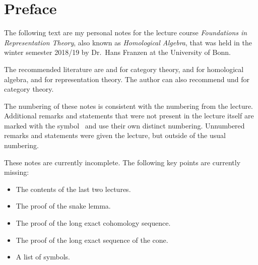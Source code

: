 \chapter{Preface}

The following text are my personal notes for the lecture course \emph{Foundations in Representation Theory}, also known as \emph{Homological Algebra}, that was held in the winter semester 2018/19 by Dr.\ Hans Franzen  at the University of Bonn.

The recommended literature are \cite{Working} and \cite{Schubert} for category theory, \cite[Chapter~1]{SheavesManifolds} and \cite{Weibel} for homological algebra, and \cite{Elements} for representation theory.
The author can also recommend \cite{BasicCategory} und \cite{Brandenburg} for category theory.

The numbering of these notes is consistent with the numbering from the lecture.
Additional remarks and statements that were not present in the lecture itself are marked with the symbol~\textsuperscript{\extrasymbol} and use their own distinct numbering.
Unnumbered remarks and statements were given the lecture, but outside of the usual numbering.

These notes are currently incomplete.
The following key points are currently missing:
\begin{itemize}
  \item
    The contents of the last two lectures.
  \item
    The proof of the snake lemma.
  \item
    The proof of the long exact cohomology sequence.
  \item
    The proof of the long exact sequence of the cone.
  \item
    A list of symbols.
\end{itemize}




